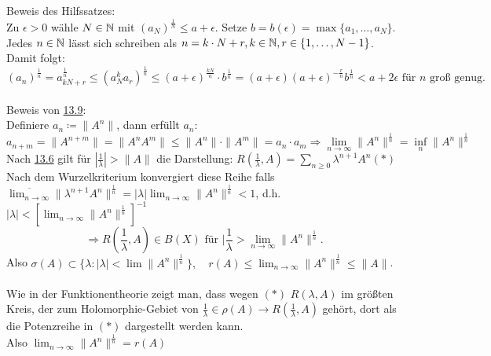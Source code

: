 \begin{beweis}
	Beweis des Hilfssatzes: \\
	Zu $\epsilon > 0$ wähle $N \in \mathbb{N}$ mit $(a_{N})^{\frac{1}{N}} \leq a + \epsilon$. Setze $b = b(\epsilon) = \max \{ a_{1}, \dotsc, a_{N} \}$. \\
	Jedes $n \in \mathbb{N}$ lässt sich schreiben als $n = k \cdot N + r, k \in \mathbb{N}, r \in \{ 1, \dotsc, N - 1 \}$. \\
	Damit folgt:
		\[ (a_{n})^{\frac{1}{n}} = a_{k N + r}^{\frac{1}{n}} \leq (a_{N}^{k} a_{r})^{\frac{1}{n}} \leq (a + \epsilon)^{\frac{k N}{n}} \cdot b^{\frac{1}{n}} = (a + \epsilon)(a + \epsilon)^{- \frac{r}{n}} b^{\frac{1}{n}} < a + 2 \epsilon \text{ für } n \text{ gro{\ss} genug.} \] ~\\
	Beweis von \hyperref[satz:13.9]{13.9}: \\
	Definiere $a_{n} \coloneqq \| A^{n} \|$, dann erfüllt $a_{n}$:
	 \[ a_{n + m} = \| A^{n + m} \| = \| A^{n} A^{m} \| \leq \|A^{n}\| \cdot \|A^{m}\| = a_{n} \cdot a_{m} \Rightarrow \lim_{n \rightarrow \infty} \| A^{n} \|^{\frac{1}{n}} = \inf_{n} \| A^{n} \|^{\frac{1}{n}} \]
	Nach \hyperref[satz:13.6]{13.6} gilt für $\left| \frac{1}{\lambda} \right| > \| A \|$ die Darstellung: $R(\frac{1}{\lambda}, A) = \sum_{n \geq 0} \lambda^{n +1} A^{n} (*) \label{eq:13.9.5-*}$ \\ 
	Nach dem Wurzelkriterium konvergiert diese Reihe falls $\overline{\lim_{n \rightarrow \infty}} \| \lambda^{n + 1} A^{n} \|^{\frac{1}{n}} = |\lambda| \lim_{n \rightarrow \infty} \| A^{n} \|^{\frac{1}{n}} < 1$, d.h. $| \lambda | < \left[ \lim_{n \rightarrow \infty} \| A^{n} \|^{\frac{1}{n}} \right]^{-1}$
	\[ \Rightarrow R( \frac{1}{\lambda}, A) \in B(X) \text{ für } |\frac{1}{\lambda} > \lim_{n \rightarrow \infty} \| A^{n} \|^{\frac{1}{n}}. \]
	Also $\sigma(A) \subset \{ \lambda: |\lambda| < \lim \| A^{n} \|^{\frac{1}{n}} \}, \quad r(A) \leq \lim_{n \rightarrow \infty} \| A^{n} \|^{\frac{1}{n}} \leq \|A\|$. \\ \\
	Wie in der Funktionentheorie zeigt man, dass wegen \hyperref[eq:13.9.5-*]{$(*)$} $R(\lambda, A)$ im grö{\ss}ten Kreis, der zum Holomorphie-Gebiet von $\frac{1}{\lambda} \in \rho(A) \rightarrow R(\frac{1}{\lambda}, A)$ gehört, dort als die Potenzreihe in \hyperref[eq:13.9.5-*]{$(*)$} dargestellt werden kann. \\
	Also $\lim_{n \rightarrow \infty} \|A^{n} \|^{\frac{1}{n}} = r(A)$
\end{beweis}


